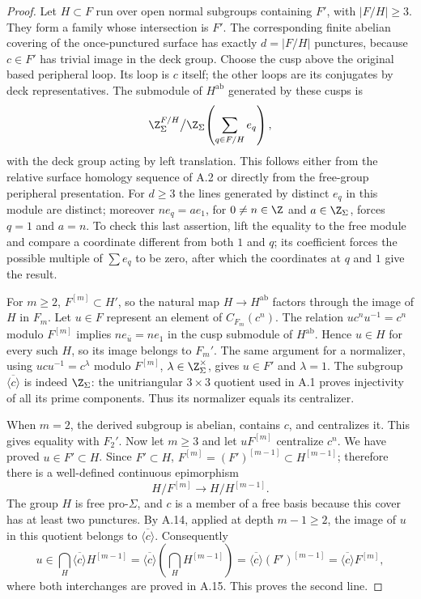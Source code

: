 \begin{proof}
Let $H\subset F$ run over open normal subgroups containing $F'$, with $|F/H|\ge3$. They form a family whose intersection is $F'$. The corresponding finite abelian covering of the once-punctured surface has exactly $d=|F/H|$ punctures, because $c\in F'$ has trivial image in the deck group. Choose the cusp above the original based peripheral loop. Its loop is $c$ itself; the other loops are its conjugates by deck representatives. The submodule of $H^{\mathrm{ab}}$ generated by these cusps is
\[
 \Z_\Sigma^{F/H}\big/\Z_\Sigma\!\left(\sum_{q\in F/H}e_q\right),
\]
with the deck group acting by left translation. This follows either from the relative surface homology sequence of A.2 or directly from the free-group peripheral presentation. For $d\ge3$ the lines generated by distinct $e_q$ in this module are distinct; moreover $ne_q=ae_1$, for $0\ne n\in\Z$ and $a\in\Z_\Sigma$, forces $q=1$ and $a=n$. To check this last assertion, lift the equality to the free module and compare a coordinate different from both $1$ and $q$; its coefficient forces the possible multiple of $\sum e_q$ to be zero, after which the coordinates at $q$ and $1$ give the result.

For $m\ge2$, $F^{[m]}\subset H'$, so the natural map $H\to H^{\mathrm{ab}}$ factors through the image of $H$ in $F_m$. Let $u\in F$ represent an element of $C_{F_m}(c^n)$. The relation $uc^nu^{-1}=c^n$ modulo $F^{[m]}$ implies $ne_{\bar u}=ne_1$ in the cusp submodule of $H^{\mathrm{ab}}$. Hence $u\in H$ for every such $H$, so its image belongs to $F_m'$. The same argument for a normalizer, using $uc u^{-1}=c^\lambda$ modulo $F^{[m]}$, $\lambda\in\Z_\Sigma^\times$, gives $u\in F'$ and $\lambda=1$. The subgroup $\overline{\langle c\rangle}$ is indeed $\Z_\Sigma$: the unitriangular $3\times3$ quotient used in A.1 proves injectivity of all its prime components. Thus its normalizer equals its centralizer.

When $m=2$, the derived subgroup is abelian, contains $c$, and centralizes it. This gives equality with $F_2'$. Now let $m\ge3$ and let $uF^{[m]}$ centralize $c^n$. We have proved $u\in F'\subset H$. Since $F'\subset H$,
$F^{[m]}=(F')^{[m-1]}\subset H^{[m-1]}$; therefore there is a well-defined continuous epimorphism
\[
 H/F^{[m]}\longrightarrow H/H^{[m-1]}.
\]
The group $H$ is free pro-$\Sigma$, and $c$ is a member of a free basis because this cover has at least two punctures. By A.14, applied at depth $m-1\ge2$, the image of $u$ in this quotient belongs to $\overline{\langle c\rangle}$. Consequently
\[
 u\in\bigcap_H\overline{\langle c\rangle}H^{[m-1]}
 =\overline{\langle c\rangle}\left(\bigcap_H H^{[m-1]}\right)
 =\overline{\langle c\rangle}(F')^{[m-1]}
 =\overline{\langle c\rangle}F^{[m]},
\]
where both interchanges are proved in A.15. This proves the second line.


\end{proof}
